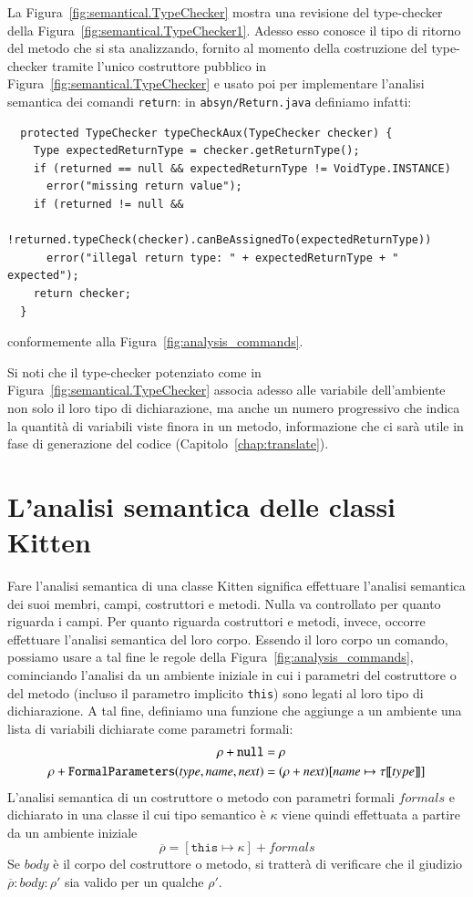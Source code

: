 La Figura~\ref{fig:semantical.TypeChecker} mostra una revisione del
type-checker della Figura~\ref{fig:semantical.TypeChecker1}.
Adesso esso conosce il tipo di ritorno del metodo che
si sta analizzando, fornito al momento della
costruzione del type-checker tramite l'unico costruttore pubblico
in Figura~\ref{fig:semantical.TypeChecker} e usato poi per
implementare l'analisi semantica dei comandi \texttt{return}: in
\texttt{absyn/Return.java} definiamo infatti:
%
\begin{verbatim}
  protected TypeChecker typeCheckAux(TypeChecker checker) {
    Type expectedReturnType = checker.getReturnType();
    if (returned == null && expectedReturnType != VoidType.INSTANCE)
      error("missing return value");
    if (returned != null &&
        !returned.typeCheck(checker).canBeAssignedTo(expectedReturnType))
      error("illegal return type: " + expectedReturnType + " expected");
    return checker;
  }
\end{verbatim}
conformemente alla Figura~\ref{fig:analysis_commands}.

Si noti che il type-checker potenziato come
in Figura~\ref{fig:semantical.TypeChecker} associa adesso
alle variabile dell'ambiente non solo il loro tipo di dichiarazione,
ma anche un numero progressivo che indica la quantit\`a di variabili
viste finora in un metodo, informazione che ci sar\`a utile in fase di generazione del
codice (Capitolo~\ref{chap:translate}).
%
\section{L'analisi semantica delle classi Kitten}
  \label{sec:analysis_classes}
%
Fare l'analisi semantica di una classe Kitten significa effettuare
l'analisi semantica dei suoi membri, \cioe campi, costruttori e metodi.
Nulla va controllato per quanto riguarda i campi. Per quanto riguarda
costruttori e metodi, invece, occorre effettuare l'analisi semantica
del loro corpo. Essendo il loro corpo un comando, possiamo usare a tal
fine le regole della Figura~\ref{fig:analysis_commands}, cominciando
l'analisi da un ambiente iniziale in cui i parametri del costruttore
o del metodo (incluso il parametro implicito \texttt{this})
sono legati al loro tipo di dichiarazione. A tal fine, definiamo una funzione che
aggiunge a un ambiente una lista di variabili dichiarate come parametri
formali:
%
\begin{align*}
  \rho+{\mathtt{null}}&=\rho \\
  \rho+{\mathtt{FormalParameters(\mathit{type},\mathit{name},\mathit{next})}}&=(\rho+{\mathit{next}})[\mathit{name}\mapsto{\tau[\![{type}]\!]}]
\end{align*}
%
L'analisi semantica di un costruttore o metodo con parametri formali
$\mathit{formals}$ e dichiarato in una classe
il cui tipo semantico \`e $\kappa$ viene quindi effettuata
a partire da un ambiente iniziale
\[
  \overline{\rho}=[\mathtt{this}\mapsto\kappa]+{\mathit{formals}}
\]
Se $\mathit{body}$ \`e il corpo del costruttore o metodo, si tratter\`a
di verificare che il giudizio $\overline{\rho}:\mathit{body}:\rho'$ sia
valido per un qualche $\rho'$.

